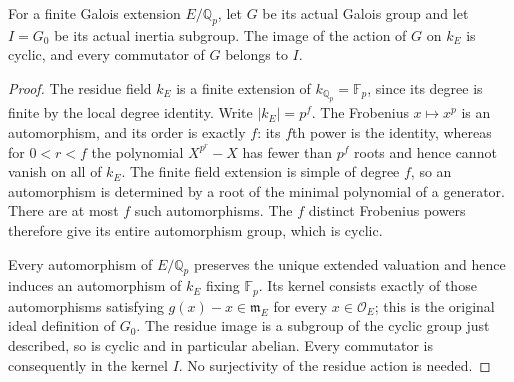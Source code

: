\begin{lemma}
\label{ft:finite-rational-residue-commutators}
\leanok
{}
For a finite Galois extension $E/\mathbb Q_p$, let $G$ be its actual
Galois group and let $I=G_0$ be its actual inertia subgroup.
The image of the action of $G$ on $k_E$ is cyclic, and every
commutator of $G$ belongs to $I$.
\end{lemma}
\begin{proof}
The residue field $k_E$ is a finite extension of $k_{\mathbb Q_p}=\mathbb F_p$,
since its degree is finite by the local degree identity. Write
$|k_E|=p^f$. The Frobenius $x\mapsto x^p$ is an automorphism,
and its order is exactly $f$: its $f$th power is the identity,
whereas for $0<r<f$ the polynomial $X^{p^r}-X$ has fewer than
$p^f$ roots and hence cannot vanish on all of $k_E$.
The finite field extension is simple of degree $f$, so an automorphism
is determined by a root of the minimal polynomial of a generator.
There are at most $f$ such automorphisms. The $f$ distinct Frobenius
powers therefore give its entire automorphism group, which is cyclic.

Every automorphism of $E/\mathbb Q_p$ preserves the unique extended
valuation and hence induces an automorphism of $k_E$ fixing $\mathbb F_p$.
Its kernel consists exactly of those automorphisms satisfying
$g(x)-x\in\mathfrak m_E$ for every $x\in\mathcal O_E$; this is the
original ideal definition of $G_0$.
The residue image is a subgroup of the cyclic group just described,
so is cyclic and in particular abelian. Every commutator is consequently
in the kernel $I$. No surjectivity of the residue action is needed.
\end{proof}

